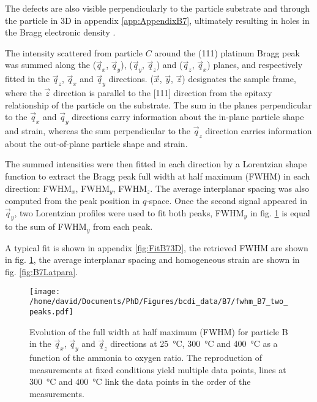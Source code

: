 The defects are also visible perpendicularly to the particle substrate and through the particle in 3D in appendix \ref{app:AppendixB7}, ultimately resulting in holes in the Bragg electronic density \parencite{Clark2015, Dupraz2015}.

The intensity scattered from particle $C$ around the (111) platinum Bragg peak was summed along the ($\vec{q}_x$, $\vec{q}_y$), ($\vec{q}_y$, $\vec{q}_z$) and ($\vec{q}_z$, $\vec{q}_x$) planes, and respectively fitted in the $\vec{q}_z$, $\vec{q}_x$ and $\vec{q}_y$ directions.
($\vec{x}$, $\vec{y}$, $\vec{z}$) designates the sample frame, where the $\vec{z}$ direction is parallel to the [111] direction from the epitaxy relationship of the particle on the substrate.
The sum in the planes perpendicular to the $\vec{q}_x$ and $\vec{q}_y$ directions carry information about the in-plane particle shape and strain, whereas the sum perpendicular to the $\vec{q}_z$ direction carries information about the out-of-plane particle shape and strain.

The summed intensities were then fitted in each direction by a Lorentzian shape function to extract the Bragg peak full width at half maximum (FWHM) in each direction: FWHM$_x$, FWHM$_y$, FWHM$_z$.
The average interplanar spacing was also computed from the peak position in $q$-space.
Once the second signal appeared in $\vec{q}_y$, two Lorentzian profiles were used to fit both peaks, FWHM$_y$ in fig. \ref{fig:B7FWHM} is equal to the sum of FWHM$_y$ from each peak.

A typical fit is shown in appendix \ref{fig:FitB73D}, the retrieved FWHM are shown in fig. \ref{fig:B7FWHM}, the average interplanar spacing and homogeneous strain are shown in fig. \ref{fig:B7Latpara}.

\begin{figure}[!htb]
    \centering
    \texttt{[image: /home/david/Documents/PhD/Figures/bcdi\_data/B7/fwhm\_B7\_two\_peaks.pdf]}
    \caption{
        Evolution of the full width at half maximum (FWHM) for particle B in the $\vec{q}_x$, $\vec{q}_y$ and $\vec{q}_z$ directions at \qty{25}{\degreeCelsius}, \qty{300}{\degreeCelsius} and \qty{400}{\degreeCelsius} as a function of the ammonia to oxygen ratio.
        The reproduction of measurements at fixed conditions yield multiple data points, lines at \qty{300}{\degreeCelsius} and \qty{400}{\degreeCelsius} link the data points in the order of the measurements.
    }
    \label{fig:B7FWHM}
\end{figure}

